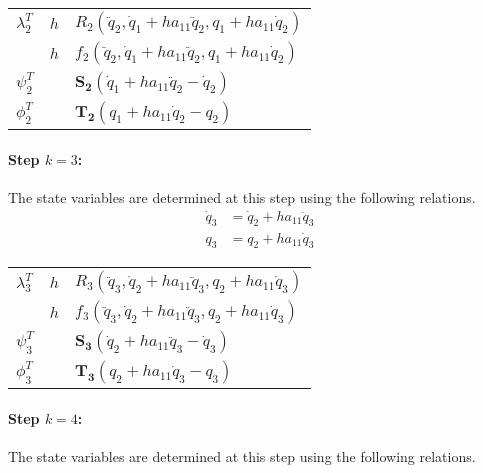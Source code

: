 \documentclass[10pt,letter]{book}
\begin{document}
     \begin{table}[H]
       \centering
       \begin{tabular}{l | l  |l}
         $\lambda_{2}^T$ & $h$ & $R_2(\ddot{q}_2, \dot{q}_1 + h a_{11} \ddot{q}_{2},  q_1 + h a_{11} \dot{q}_{2} )$\\
                        & $h$ & $f_2(\ddot{q}_2, \dot{q}_1 + h a_{11} \ddot{q}_{2},  q_1 + h a_{11} \dot{q}_{2} )$\\
         $\psi_2^T$ & & $\mathbf{S_2}\left(\dot{q}_1 + h a_{11} \ddot{q}_{2}- \dot{q}_{2} \right)$ \\
         $\phi_2^T$ & & $\mathbf{T_2}\left(q_1 + h a_{11} \dot{q}_{2} - q_{2}\right) $ \\
       \end{tabular}
     \end{table}

     \paragraph{Step $k=3$:}
     The state variables are determined at this step using the
     following relations.
     \begin{equation}\nonumber
       \begin{split}
         \dot{q}_{3} &= \dot{q}_2 + h a_{11} \ddot{q}_{3}  \\
         q_{3}       &= q_2 + h a_{11} \dot{q}_{3}
       \end{split}
     \end{equation}

     \begin{table}[H]
       \centering
       \begin{tabular}{l | l  |l}
         $\lambda_{3}^T$ & $h$ & $R_3(\ddot{q}_3, \dot{q}_2 + h a_{11} \ddot{q}_{3},  q_2 + h a_{11} \dot{q}_{3} )$\\
                        & $h$ & $f_3(\ddot{q}_3, \dot{q}_2 + h a_{11} \ddot{q}_{3},  q_2 + h a_{11} \dot{q}_{3} )$\\
         $\psi_3^T$ & & $\mathbf{S_3}\left(\dot{q}_2 + h a_{11} \ddot{q}_{3}- \dot{q}_{3} \right)$ \\
         $\phi_3^T$ & & $\mathbf{T_3}\left(q_2 + h a_{11} \dot{q}_{3} - q_{3}\right) $ \\
       \end{tabular}
     \end{table}

     \paragraph{Step $k=4$:}
     The state variables are determined at this step using the
     following relations.
\end{document}
